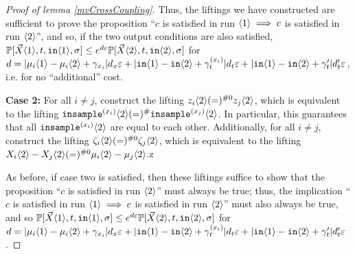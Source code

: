 \begin{proof}[Proof of lemma \ref{mvCrossCoupling}]
    Thus, the liftings we have constructed are sufficient to prove the proposition ``$c$ is satisfied in run $\langle1 \rangle\implies c$ is satisfied in run $\langle2 \rangle$'', and so, if the two output conditions are also satisfied, $\mathbb{P}[\vec{X}\langle1 \rangle, t, \texttt{in}\langle1 \rangle, \sigma]\leq e^{d\varepsilon}\mathbb{P}[\vec{X}\langle2 \rangle, t, \texttt{in}\langle2 \rangle, \sigma]$ for 
    $d = |\mu_i\langle1 \rangle-\mu_i\langle2 \rangle+\gamma_{x_i}|d_x\varepsilon + |\texttt{in}\langle1 \rangle-\texttt{in}\langle2 \rangle+\gamma_t^{(x_i)}|d_t\varepsilon+|\texttt{in}\langle1 \rangle-\texttt{in}\langle2 \rangle+\gamma_t'|d_t'\varepsilon$, i.e. for no ``additional'' cost.     
    
    \textbf{Case 2: } For all $i\neq j$, construct the lifting $z_i\langle2 \rangle(=)^{\#0}z_j\langle2 \rangle$, which is equivalent to the lifting $\texttt{insample}^{(x_i)}\langle2 \rangle(=)^{\#}\texttt{insample}^{(x_j)}\langle2 \rangle$. In particular, this guarantees that all $\texttt{insample}^{(x_i)}\langle2 \rangle$ are equal to each other. 
    Additionally, for all $i\neq j$, construct the lifting $\zeta_i\langle2 \rangle(=)^{\#0}\zeta_j\langle2 \rangle$, which is equivalent to the lifting $X_i\langle2 \rangle - X_j\langle2 \rangle (=)^{\#0}\mu_i\langle2 \rangle-\mu_j\langle2 \rangle$.z

    As before, if case two is satisfied, then these liftings suffice to show that the proposition  ``$c$ is satisfied in run $\langle2 \rangle$'' must always be true; thus, the implication ``$c$ is satisfied in run $\langle1 \rangle\implies c$ is satisfied in run $\langle2 \rangle$'' must also always be true, and so $\mathbb{P}[\vec{X}\langle1 \rangle, t, \texttt{in}\langle1 \rangle, \sigma]\leq e^{d\varepsilon}\mathbb{P}[\vec{X}\langle2 \rangle, t, \texttt{in}\langle2 \rangle, \sigma]$ for 
    $d = |\mu_i\langle1 \rangle-\mu_i\langle2 \rangle+\gamma_{x_i}|d_x\varepsilon + |\texttt{in}\langle1 \rangle-\texttt{in}\langle2 \rangle+\gamma_t^{(x_i)}|d_t\varepsilon+|\texttt{in}\langle1 \rangle-\texttt{in}\langle2 \rangle+\gamma_t'|d_t'\varepsilon$.

\end{proof}


